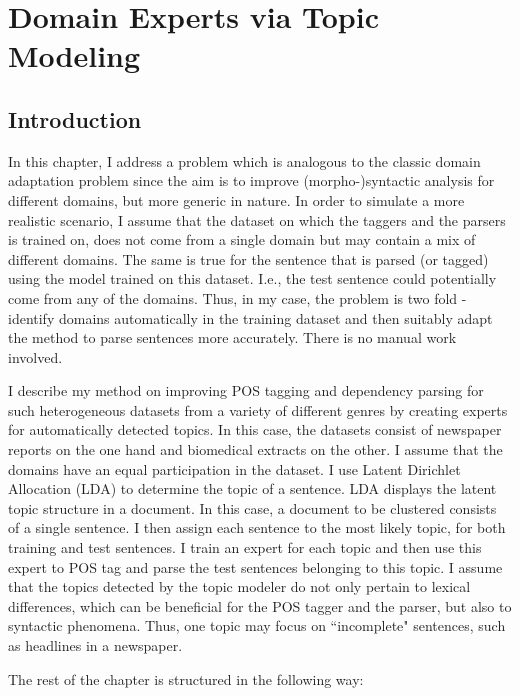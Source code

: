 \chapter{Domain Experts via Topic Modeling}


\section{Introduction}

In this chapter, I address a problem which is analogous to the classic domain adaptation problem since the aim is to improve (morpho-)syntactic analysis for different domains, but more generic in nature. In order to simulate a more realistic scenario, I assume that the  dataset on which the taggers and the parsers is trained on, does not come from a single domain but may contain a mix of different domains. The same is true for the sentence that is parsed (or tagged) using the model trained on this dataset. I.e., the test sentence could potentially come from any of the domains. Thus, in my case, the problem is two fold - identify domains automatically in the training dataset and then suitably adapt the method to parse sentences more accurately. There is no manual work involved. 

I describe my method on improving POS tagging and dependency parsing for such heterogeneous datasets from a variety of different genres by creating experts for automatically detected topics. In this case, the datasets consist of newspaper reports on the one hand and biomedical extracts on the other. I assume that the domains have an equal participation in the dataset. I use Latent Dirichlet Allocation (LDA) to determine the topic of a sentence. LDA displays the latent topic structure in a document. In this case, a document to be clustered consists of a single sentence. I then assign each sentence to the most likely topic, for both training and test sentences. I train an expert for each topic and then use this expert to POS tag and parse the test sentences belonging to this topic. I assume that the topics detected by the topic modeler do not only pertain to lexical differences, which can be beneficial for the POS tagger and the parser, but also to syntactic phenomena. Thus, one topic may focus on ``incomplete" sentences, such as headlines in a newspaper.

The rest of the chapter is structured in the following way: 



